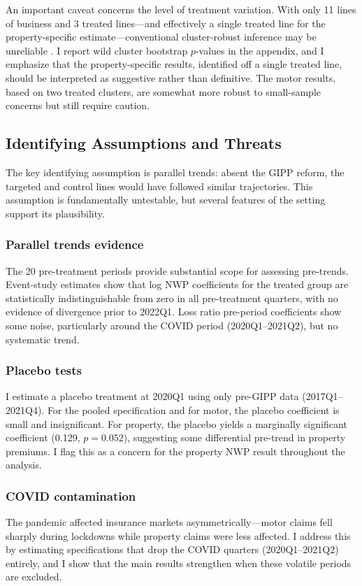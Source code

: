 \documentclass[12pt]{article}
\begin{document}
An important caveat concerns the level of treatment variation. With only 11 lines of business and 3 treated lines---and effectively a single treated line for the property-specific estimate---conventional cluster-robust inference may be unreliable \citep{CameronGelbachMiller2008}. I report wild cluster bootstrap $p$-values in the appendix, and I emphasize that the property-specific results, identified off a single treated line, should be interpreted as suggestive rather than definitive. The motor results, based on two treated clusters, are somewhat more robust to small-sample concerns but still require caution.

\subsection{Identifying Assumptions and Threats}

The key identifying assumption is parallel trends: absent the GIPP reform, the targeted and control lines would have followed similar trajectories. This assumption is fundamentally untestable, but several features of the setting support its plausibility.

\subsubsection*{Parallel trends evidence} The 20 pre-treatment periods provide substantial scope for assessing pre-trends. Event-study estimates show that log NWP coefficients for the treated group are statistically indistinguishable from zero in all pre-treatment quarters, with no evidence of divergence prior to 2022Q1. Loss ratio pre-period coefficients show some noise, particularly around the COVID period (2020Q1--2021Q2), but no systematic trend.

\subsubsection*{Placebo tests} I estimate a placebo treatment at 2020Q1 using only pre-GIPP data (2017Q1--2021Q4). For the pooled specification and for motor, the placebo coefficient is small and insignificant. For property, the placebo yields a marginally significant coefficient (0.129, $p = 0.052$), suggesting some differential pre-trend in property premiums. I flag this as a concern for the property NWP result throughout the analysis.

\subsubsection*{COVID contamination} The pandemic affected insurance markets asymmetrically---motor claims fell sharply during lockdowns while property claims were less affected. I address this by estimating specifications that drop the COVID quarters (2020Q1--2021Q2) entirely, and I show that the main results strengthen when these volatile periods are excluded.
\end{document}
